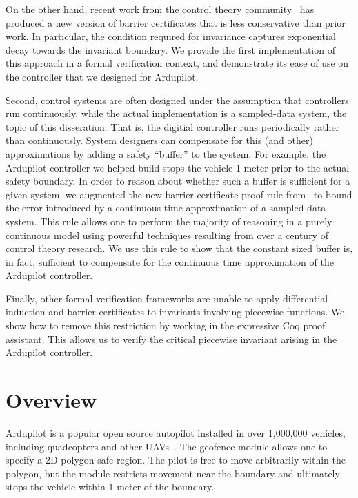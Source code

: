On the other hand, recent work from the control theory
community~\cite{kong2013barrier,xu15barrier,nguyen16barrier} has produced a
new version of barrier certificates that is less conservative than prior
work. In particular, the condition required for invariance captures
exponential decay towards the invariant boundary. We provide the first
implementation of this approach in a formal verification context, and
demonstrate its ease of use on the controller that we designed for
Ardupilot.

Second, control systems are often designed under the assumption that
controllers run continuously, while the actual implementation is a
sampled-data system, the topic of this disseration. That is, the digitial
controller runs periodically rather than continuously. System designers can
compensate for this (and other) approximations by adding a safety
``buffer'' to the system. For example, the Ardupilot controller we helped
build stops the vehicle 1 meter prior to the actual safety boundary. In
order to reason about whether such a buffer is sufficient for a given
system, we augmented the new barrier certificate proof rule
from~\cite{kong2013barrier,xu15barrier,nguyen16barrier} to bound the error
introduced by a continuous time approximation of a sampled-data
system. This rule allows one to perform the majority of reasoning in a
purely continuous model using powerful techniques resulting from over a
century of control theory research. We use this rule to show that the
constant sized buffer is, in fact, sufficient to compensate for the
continuous time approximation of the Ardupilot controller.

Finally, other formal verification frameworks are unable to apply
differential induction and barrier certificates to invariants involving
piecewise functions.  We show how to remove this restriction by working in
the expressive Coq proof assistant. This allows us to verify the critical
piecewise invariant arising in the Ardupilot controller.

\section{Overview}
\label{sec:overview}
Ardupilot is a popular open source autopilot installed in over 1,000,000
vehicles, including quadcopters and other UAVs~\cite{ardupilot}. The
geofence module allows one to specify a 2D polygon safe region. The pilot
is free to move arbitrarily within the polygon, but the module restricts
movement near the boundary and ultimately stops the vehicle within 1 meter
of the boundary.

